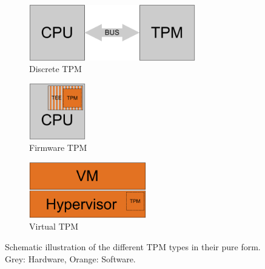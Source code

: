 \begin{figure}[htpb]
  \centering
  \begin{subfigure}{0.49\textwidth}
    \centering
    \includegraphics[height=2.43cm]{figures/dTPM.pdf}
    \caption{Discrete TPM}\label{fig:dtpm}
  \end{subfigure}%
  \hspace*{\fill}   %
  \begin{subfigure}{0.49\textwidth}
    \centering
    \includegraphics[height=2.43cm]{figures/fTPM.pdf}
    \caption{Firmware TPM}\label{fig:ftpm}
  \end{subfigure}%

  \begin{subfigure}{0.49\textwidth}
    \centering
    \includegraphics[height=2.43cm]{figures/vTPM.pdf}
    \caption{Virtual TPM}\label{fig:vtpm}
  \end{subfigure}%

  \caption{Schematic illustration of the different TPM types in their pure form. Grey: Hardware, Orange: Software.}\label{fig:tpm_types}
\end{figure}
